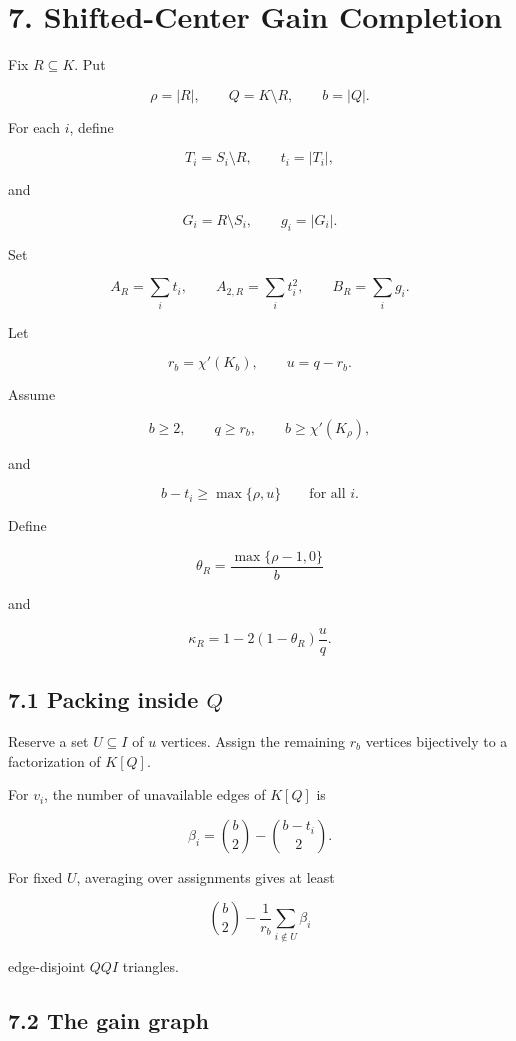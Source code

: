 \documentclass[11pt,a4paper]{article}
\begin{document}
\section{7. Shifted-Center Gain Completion}\label{shifted-center-gain-completion}

Fix \(R\subseteq K\). Put

\[
\rho=|R|,
\qquad
Q=K\setminus R,
\qquad
b=|Q|.
\]

For each \(i\), define

\[
T_i=S_i\setminus R,
\qquad
t_i=|T_i|,
\]

and

\[
G_i=R\setminus S_i,
\qquad
g_i=|G_i|.
\]

Set

\[
A_R=\sum_i t_i,
\qquad
A_{2,R}=\sum_i t_i^2,
\qquad
B_R=\sum_i g_i.
\]

Let

\[
r_b=\chi'(K_b),
\qquad
u=q-r_b.
\]

Assume

\[
b\ge2,
\qquad
q\ge r_b,
\qquad
b\ge\chi'(K_\rho),
\tag{7.1}
\]

and

\[
b-t_i\ge\max\{\rho,u\}
\qquad
\text{for all }i.
\tag{7.2}
\]

Define

\[
\theta_R=\frac{\max\{\rho-1,0\}}{b}
\]

and

\[
\kappa_R
=
1-2(1-\theta_R)\frac{u}{q}.
\tag{7.3}
\]

\subsection{\texorpdfstring{7.1 Packing inside \(Q\)}{7.1 Packing inside Q}}\label{packing-inside-q}

Reserve a set \(U\subseteq I\) of \(u\) vertices. Assign the remaining \(r_b\) vertices bijectively to a factorization of \(K[Q]\).

For \(v_i\), the number of unavailable edges of \(K[Q]\) is

\[
\beta_i
=
\binom b2-\binom{b-t_i}{2}.
\tag{7.4}
\]

For fixed \(U\), averaging over assignments gives at least

\[
\binom b2-\frac1{r_b}\sum_{i\notin U}\beta_i
\tag{7.5}
\]

edge-disjoint \(QQI\) triangles.

\subsection{7.2 The gain graph}\label{the-gain-graph}
\end{document}
